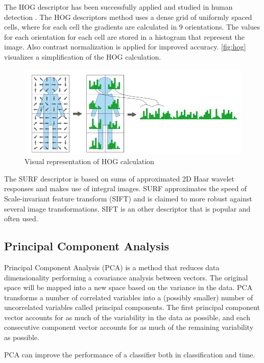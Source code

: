 The HOG descriptor has been successfully applied and studied in human detection \cite{NavneetDalal2006, watanabe2009}. The HOG descriptors method uses a dense grid of uniformly spaced cells, where for each cell the gradients are calculated in 9 orientations. The values for each orientation for each cell are stored in a histogram that represent the image. Also contrast normalization is applied for improved accuracy. \autoref{fig:hog} visualizes a simplification of the HOG calculation. 

\begin{figure}[htbp]
\center{}
\includegraphics[width=0.8\linewidth]{figures/hog.png}
\caption{Visual representation of HOG calculation}
\label{fig:hog}
\end{figure}


The SURF descriptor is based on sums of approximated 2D Haar wavelet responses and makes use of integral images. SURF approximates the speed of Scale-invariant feature transform (SIFT) and is claimed to more robust against several image transformations\cite{Murillo2007, Valgren2010}. SIFT is an other descriptor that is popular and often used.




\subsection{Principal Component Analysis}
Principal Component Analysis (PCA) is a method that reduces data dimensionality performing a covariance analysis between vectors. The original space will be mapped into a new space based on the variance in the data. PCA transforms a number of correlated variables into a (possibly smaller) number of uncorrelated variables called principal components. The first principal component vector accounts for as much of the variability in the data as possible, and each consecutive component vector accounts for as much of the remaining variability as possible.

PCA can improve the performance of a classifier both in classification and time.

